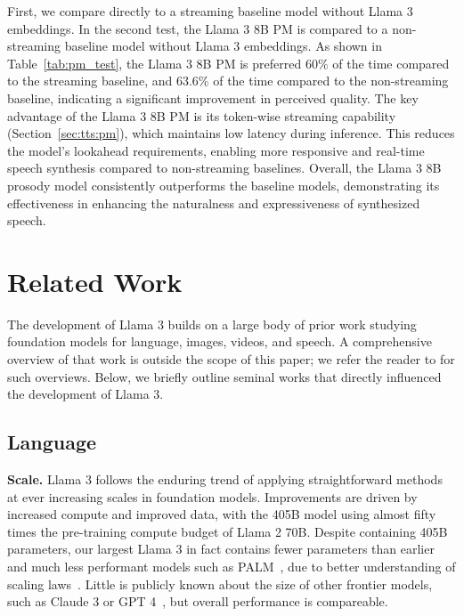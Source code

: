 \documentclass[dvipsnames]{fairmeta}
\begin{document}
First, we compare directly to a streaming baseline model without Llama 3 embeddings. 
In  the second test, the Llama 3 8B PM is compared to a non-streaming baseline model without Llama 3 embeddings. 
As shown in Table~\ref{tab:pm_test}, the Llama 3 8B PM is preferred  60\% of the time compared to the streaming baseline, and 63.6\% of the time  compared to the non-streaming baseline, indicating a significant improvement in perceived quality. The key advantage of the Llama 3 8B PM is its token-wise streaming capability (Section~\ref{sec:tts:pm}), which maintains low latency during inference. This reduces the model's lookahead requirements, enabling more responsive and real-time speech synthesis compared to non-streaming baselines.
Overall, the Llama 3 8B prosody model consistently outperforms the baseline models, demonstrating its effectiveness in enhancing the naturalness and expressiveness of synthesized speech.

\section{Related Work}
\label{section:related_work}
The development of Llama 3 builds on a large body of prior work studying foundation models for language, images, videos, and speech.
A comprehensive overview of that work is outside the scope of this paper; we refer the reader to \citet{bordes2024vlm,madan2024foundation,LLMSurvey} for such overviews.
Below, we briefly outline seminal works that directly influenced the development of Llama 3.

\subsection{Language}
\label{section:related_work_language}

\textbf{Scale.}
Llama 3 follows the enduring trend of applying straightforward methods at ever increasing scales in foundation models. Improvements are driven by increased compute and improved data, with the 405B model using almost fifty times the pre-training compute budget of Llama 2 70B. Despite containing 405B parameters, our largest Llama 3 in fact contains fewer parameters than earlier and much less performant models such as PALM~\citep{chowdhery2023palm}, due to better understanding of scaling laws~\citep{kaplan2020scaling,hoffmann2022chinchilla}. Little is publicly known about the size of other frontier models, such as Claude 3 or GPT 4~\citep{openai2023gpt4}, but overall performance is compareable. 
\end{document}
